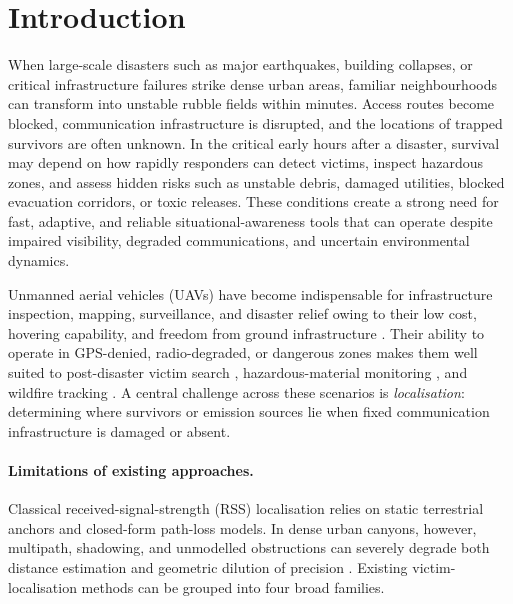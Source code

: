 \documentclass[drones,article,accept,pdftex,moreauthors]{Definitions/mdpi}
\begin{document}

\section{Introduction}\label{sec:intro}

When large-scale disasters such as major earthquakes, building collapses, or critical infrastructure failures strike dense urban areas, familiar neighbourhoods can transform into unstable rubble fields within minutes. Access routes become blocked, communication infrastructure is disrupted, and the locations of trapped survivors are often unknown. In the critical early hours after a disaster, survival may depend on how rapidly responders can detect victims, inspect hazardous zones, and assess hidden risks such as unstable debris, damaged utilities, blocked evacuation corridors, or toxic releases. These conditions create a strong need for fast, adaptive, and reliable situational-awareness tools that can operate despite impaired visibility, degraded communications, and uncertain environmental dynamics.

Unmanned aerial vehicles (UAVs) have become indispensable for infrastructure inspection, mapping, surveillance, and disaster relief owing to their low cost, hovering capability, and freedom from ground infrastructure
\citep{valavanisHandbookUnmannedAerial2015,austinUnmannedAircraftSystems2010a,yaoUnmannedAerialVehicle2019,kocerInspectionwhileflyingAutonomousContactbased2019}.
Their ability to operate in GPS-denied, radio-degraded, or dangerous zones makes them well suited to post-disaster victim search
\citep{tomicFullyAutonomousUAV2012,hanSurveyMobileAnchor2016,wangGuideLocUAVAssistedMultitarget2017,zhouMultiUAVDRL2024,ewersTimeCriticalSAR2024},
hazardous-material monitoring
\citep{pintoRadiologicalScoutingMonitoring2021,stibingerLocalizationIonizingRadiation2020},
and wildfire tracking
\citep{phamDistributedControlFramework2018}.
A central challenge across these scenarios is \emph{localisation}: determining where survivors or emission sources lie when fixed communication infrastructure is damaged or absent.

\paragraph{Limitations of existing approaches.}
Classical received-signal-strength (RSS) localisation relies on static terrestrial anchors and closed-form path-loss models. In dense urban canyons, however, multipath, shadowing, and unmodelled obstructions can severely degrade both distance estimation and geometric dilution of precision
\citep{zanellaBestPracticeRSS2016,liuRSSDistributionBasedPassive2016}.
Existing victim-localisation methods can be grouped into four broad families.
\end{document}
